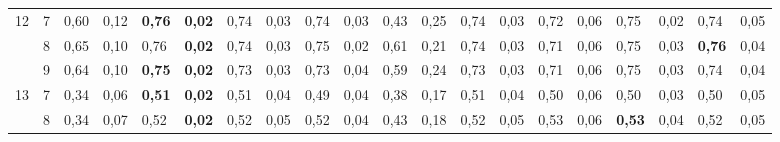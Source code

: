 \documentclass[conference]{IEEEtran}
\begin{document}
\begin{table}[]
\begin{tabular}{|cl|ll|ll|ll|ll|ll|ll|ll|ll|ll|}
		\multicolumn{1}{|c|}{\multirow{3}{*}{12}} & 7 & \multicolumn{1}{l|}{0,60}          & 0,12          & \multicolumn{1}{l|}{\textbf{0,76}} & \textbf{0,02} & \multicolumn{1}{l|}{0,74}          & 0,03          & \multicolumn{1}{l|}{0,74} & 0,03          & \multicolumn{1}{l|}{0,43}                 & 0,25          & \multicolumn{1}{l|}{0,74}          & 0,03          & \multicolumn{1}{l|}{0,72}          & 0,06          & \multicolumn{1}{l|}{0,75}          & 0,02          & \multicolumn{1}{l|}{0,74}          & 0,05          \\ \cline{2-20} 
		\multicolumn{1}{|c|}{}                    & 8 & \multicolumn{1}{l|}{0,65}          & 0,10          & \multicolumn{1}{l|}{0,76}          & \textbf{0,02} & \multicolumn{1}{l|}{0,74}          & 0,03          & \multicolumn{1}{l|}{0,75} & 0,02          & \multicolumn{1}{l|}{0,61}                 & 0,21          & \multicolumn{1}{l|}{0,74}          & 0,03          & \multicolumn{1}{l|}{0,71}          & 0,06          & \multicolumn{1}{l|}{0,75}          & 0,03          & \multicolumn{1}{l|}{\textbf{0,76}} & 0,04          \\ \cline{2-20} 
		\multicolumn{1}{|c|}{}                    & 9 & \multicolumn{1}{l|}{0,64}          & 0,10          & \multicolumn{1}{l|}{\textbf{0,75}} & \textbf{0,02} & \multicolumn{1}{l|}{0,73}          & 0,03          & \multicolumn{1}{l|}{0,73} & 0,04          & \multicolumn{1}{l|}{0,59}                 & 0,24          & \multicolumn{1}{l|}{0,73}          & 0,03          & \multicolumn{1}{l|}{0,71}          & 0,06          & \multicolumn{1}{l|}{0,75}          & 0,03          & \multicolumn{1}{l|}{0,74}          & 0,04          \\ \hline
		\multicolumn{1}{|c|}{\multirow{3}{*}{13}} & 7 & \multicolumn{1}{l|}{0,34}          & 0,06          & \multicolumn{1}{l|}{\textbf{0,51}} & \textbf{0,02} & \multicolumn{1}{l|}{0,51}          & 0,04          & \multicolumn{1}{l|}{0,49} & 0,04          & \multicolumn{1}{l|}{0,38}                 & 0,17          & \multicolumn{1}{l|}{0,51}          & 0,04          & \multicolumn{1}{l|}{0,50}          & 0,06          & \multicolumn{1}{l|}{0,50}          & 0,03          & \multicolumn{1}{l|}{0,50}          & 0,05          \\ \cline{2-20} 
		\multicolumn{1}{|c|}{}                    & 8 & \multicolumn{1}{l|}{0,34}          & 0,07          & \multicolumn{1}{l|}{0,52}          & \textbf{0,02} & \multicolumn{1}{l|}{0,52}          & 0,05          & \multicolumn{1}{l|}{0,52} & 0,04          & \multicolumn{1}{l|}{0,43}                 & 0,18          & \multicolumn{1}{l|}{0,52}          & 0,05          & \multicolumn{1}{l|}{0,53}          & 0,06          & \multicolumn{1}{l|}{\textbf{0,53}} & 0,04          & \multicolumn{1}{l|}{0,52}          & 0,05          \\ \cline{2-20} 

\end{tabular}
\end{table}
\end{document}
